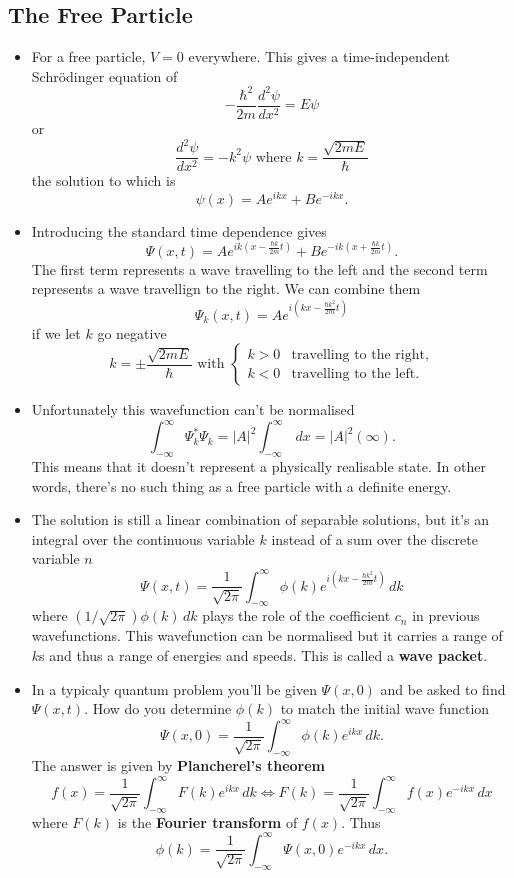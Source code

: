 \documentclass{article}
\begin{document}
\subsection{The Free Particle}

\begin{itemize}
  \item For a free particle, $V = 0$ everywhere. This gives a time-independent Schrödinger equation of \[-\frac{\hbar^2}{2 m} \frac{d^2 \psi}{d x^2} = E \psi\] or \[\frac{d^2 \psi}{d x^2} = -k^2 \psi \text{ where } k = \frac{\sqrt{2 m E}}{\hbar}\] the solution to which is \[\psi(x) = A e^{i k x} + B e^{-i k x}.\]

  \item Introducing the standard time dependence gives \[\Psi(x, t) = A e^{i k \left( x - \frac{\hbar k}{2 m} t \right)} + B e^{-i k \left( x + \frac{\hbar k}{2 m} t \right)}.\] The first term represents a wave travelling to the left and the second term represents a wave travellign to the right. We can combine them \[\Psi_k(x, t) = A e^{i \left( k x - \frac{\hbar k^2}{2 m} t \right)}\] if we let $k$ go negative \[k = \pm \frac{\sqrt{2 m E}}{\hbar} \text{ with } \begin{cases}
            k > 0 & \text{travelling to the right,} \\
            k < 0 & \text{travelling to the left.}
          \end{cases}\]

  \item Unfortunately this wavefunction can't be normalised \[\int_{-\infty}^\infty \Psi_k^* \Psi_k = |A|^2 \int_{-\infty}^\infty \,d x = |A|^2 (\infty).\] This means that it doesn't represent a physically realisable state. In other words, there's no such thing as a free particle with a definite energy.

  \item The solution is still a linear combination of separable solutions, but it's an integral over the continuous variable $k$ instead of a sum over the discrete variable $n$ \[\Psi(x, t) = \frac{1}{\sqrt{2 \pi}} \int_{-\infty}^\infty \phi(k) e^{i \left( k x - \frac{\hbar k^2}{2 m} t \right)} \,d k\] where $(1 / \sqrt{2 \pi}) \phi(k) \,d k$ plays the role of the coefficient $c_n$ in previous wavefunctions. This wavefunction can be normalised but it carries a range of $k$s and thus a range of energies and speeds. This is called a \textbf{wave packet}.

  \item In a typicaly quantum problem you'll be given $\Psi(x, 0)$ and be asked to find $\Psi(x, t)$. How do you determine $\phi(k)$ to match the initial wave function \[\Psi(x, 0) = \frac{1}{\sqrt{2 \pi}} \int_{-\infty}^\infty \phi(k) e^{i k x} \,d k.\] The answer is given by \textbf{Plancherel's theorem} \[f(x) = \frac{1}{\sqrt{2 \pi}} \int_{-\infty}^\infty F(k) e^{i k x} \,d k \Longleftrightarrow F(k) = \frac{1}{\sqrt{2 \pi}} \int_{-\infty}^\infty f(x) e^{-i k x} \,d x\] where $F(k)$ is the \textbf{Fourier transform} of $f(x)$. Thus \[\phi(k) = \frac{1}{\sqrt{2 \pi}} \int_{-\infty}^\infty \Psi(x, 0) e^{-i k x} \,d x.\]


\end{itemize}
\end{document}
